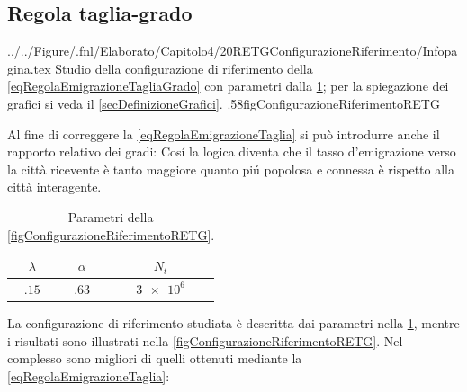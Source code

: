    \subsection{Regola taglia-grado}\label{secRETG}

        {../../Figure/.fnl/Elaborato/Capitolo4/20RETGConfigurazioneRiferimento/Infopagina.tex}
        {Studio della configurazione di riferimento della \ref{eqRegolaEmigrazioneTagliaGrado} con parametri dalla \cref{tabParametriRETG}; per la spiegazione dei grafici si veda il \cref{secDefinizioneGrafici}.}
        {.58\linewidth}{figConfigurazioneRiferimentoRETG}

      Al fine di correggere la \ref{eqRegolaEmigrazioneTaglia} si può introdurre anche il rapporto relativo dei gradi:
      Cosí la logica diventa che il tasso d'emigrazione verso la città ricevente è tanto maggiore quanto piú popolosa e connessa è rispetto alla città interagente.

      \begin{table}[htb]
        \centering
        \caption{Parametri della \cref{figConfigurazioneRiferimentoRETG}.}
        \begin{tabular}{ccc}
          \hline
          \(\lambda\)&\(\alpha\)&\(N_t\)\\
          \hline
          \(\num{.15}\)&\(\num{.63}\)&\(\num{3e6}\)\\
          \hline
        \end{tabular}
        \label{tabParametriRETG}
      \end{table}

      La configurazione di riferimento studiata è descritta dai parametri nella \cref{tabParametriRETG}, mentre i risultati sono illustrati nella \cref{figConfigurazioneRiferimentoRETG}. Nel complesso sono migliori di quelli ottenuti mediante la \ref{eqRegolaEmigrazioneTaglia}: 

